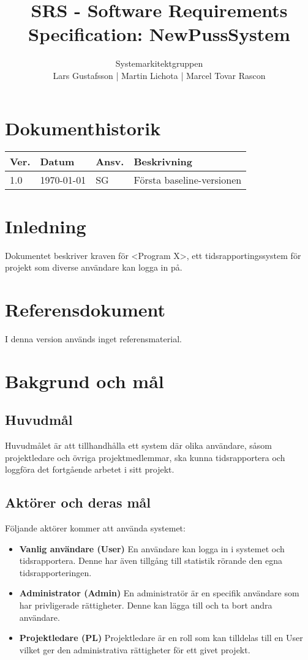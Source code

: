 \documentclass[a4paper]{article}
\title{SRS - Software Requirements Specification: NewPussSystem}
\author{Systemarkitektgruppen \\ Lars Gustafsson | Martin Lichota | Marcel Tovar Rascon}
\date{}
\begin{document}
\maketitle
\thispagestyle{fancy}
\tableofcontents
\newpage

\section*{Dokumenthistorik}

\begin{tabular}{ l l l l }
Ver. & Datum & Ansv. & Beskrivning \\\hline
1.0 & \today & SG & Första baseline-versionen

\end{tabular}
\section{Inledning}       


Dokumentet beskriver kraven för <Program X>, ett tidsrapportingssystem för projekt som diverse användare kan logga in på.

\section{Referensdokument}
I denna version används inget referensmaterial.
\section{Bakgrund och mål}   
\subsection{Huvudmål}
Huvudmålet är att tillhandhålla ett system där olika användare, såsom projektledare och övriga projektmedlemmar, ska kunna tidsrapportera och loggföra det fortgående arbetet i sitt projekt. 

\subsection{Aktörer och deras mål}
Följande aktörer kommer att använda systemet:
\begin{itemize}
\item [] \textbf{Vanlig användare (User)} En användare kan logga in i systemet och tidsrapportera. Denne har även tillgång till statistik rörande den egna tidsrapporteringen.
\item [] \textbf{Administrator (Admin)} En administratör är en specifik användare som har privligerade rättigheter. Denne kan lägga till och ta bort andra användare.
\item [] \textbf{Projektledare (PL)} Projektledare är en roll som kan tilldelas till en User vilket ger den administrativa rättigheter för ett givet projekt.
\end{itemize}
\end{document}
